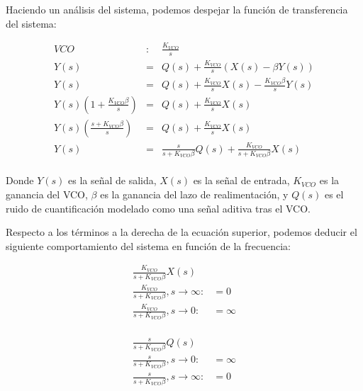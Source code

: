 \documentclass[12pt]{report} %
\begin{document}
	Haciendo un análisis del sistema, podemos despejar la función de transferencia del sistema:
	
	\begin{figure}[H]
		\label{vco-closed-loop-s}
		\begin{equation}
		\begin{array}{lcl}
		VCO & : & \frac{K_{VCO}}{s} \\
		Y(s) &=& Q(s) + \frac{K_{VCO}}{s}(X(s) - \beta Y(s) ) \\
		Y(s) &=& Q(s) + \frac{K_{VCO}}{s}X(s) - \frac{K_{VCO} \beta}{s}Y(s) \\
		Y(s) (1 + \frac{K_{VCO}\beta}{s}) &=& Q(s) + \frac{K_{VCO}}{s}X(s) \\
		Y(s) (\frac{s + K_{VCO}\beta}{s}) &=& Q(s) + \frac{K_{VCO}}{s}X(s) \\
		Y(s) &=& \frac{s}{s + K_{VCO}\beta}Q(s) + \frac{K_{VCO}}{s + K_{VCO}\beta}X(s) \\
		\end{array}
		\end{equation}
	\end{figure}
	
	Donde $Y(s)$ es la señal de salida, $X(s)$ es la señal de entrada, $K_{VCO}$ es la ganancia del VCO, $\beta$ es la ganancia del lazo de realimentación, y $Q(s)$ es el ruido de cuantificación modelado como una señal aditiva tras el VCO.
	
	Respecto a los términos a la derecha de la ecuación superior, podemos deducir el siguiente comportamiento del sistema en función de la frecuencia:
	
	\begin{figure}[H]
		\label{vco-closed-loop-terms-x}
		\begin{equation}
		\begin{array}{lcl}
		\frac{K_{VCO}}{s + K_{VCO}\beta}X(s) & \\
		\frac{K_{VCO}}{s + K_{VCO}\beta}, s \to \infty: & = 0 \\
		\frac{K_{VCO}}{s + K_{VCO}\beta}, s \to 0: & = \infty \\
		\end{array}
		\end{equation}
	\end{figure}

	\begin{figure}[H]
		\label{vco-closed-loop-terms-q}
		\begin{equation}
		\begin{array}{lcl}
		\frac{s}{s + K_{VCO}\beta}Q(s) & \\
		\frac{s}{s + K_{VCO}\beta}, s \to 0: & = \infty \\
		\frac{s}{s + K_{VCO}\beta}, s \to \infty: & = 0 \\
		\end{array}
		\end{equation}
	\end{figure}
\end{document}
